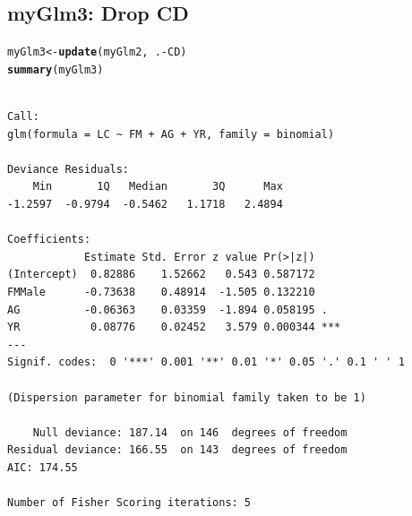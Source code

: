 \documentclass[oneside]{book}\usepackage[]{graphicx}\usepackage[svgnames]{xcolor}
\makeatletter
\newcommand{\hlopt}[1]{\textcolor[rgb]{0,0,0}{#1}}%
\newcommand{\hlstd}[1]{\textcolor[rgb]{0.345,0.345,0.345}{#1}}%
\newcommand{\hlkwb}[1]{\textcolor[rgb]{0.69,0.353,0.396}{#1}}%
\newcommand{\hlkwd}[1]{\textcolor[rgb]{0.737,0.353,0.396}{\textbf{#1}}}%
\newenvironment{kframe}{%
 \def\at@end@of@kframe{}%
 \ifinner\ifhmode%
  \def\at@end@of@kframe{\end{minipage}}%
  \begin{minipage}{\columnwidth}%
 \fi\fi%
 \def\FrameCommand##1{\hskip\@totalleftmargin \hskip-\fboxsep
 \colorbox{shadecolor}{##1}\hskip-\fboxsep
     \hskip-\linewidth \hskip-\@totalleftmargin \hskip\columnwidth}%
 \MakeFramed {\advance\hsize-\width
   \@totalleftmargin\z@ \linewidth\hsize
   \@setminipage}}%
 {\par\unskip\endMakeFramed%
 \at@end@of@kframe}
\newenvironment{knitrout}{}{} %
\makeatother
\begin{document}
\subsection*{myGlm3: Drop CD}
\begin{knitrout}
\color{fgcolor}\begin{kframe}
\begin{alltt}
\hlstd{myGlm3} \hlkwb{<-} \hlkwd{update}\hlstd{(myGlm2,} \hlopt{~}\hlstd{.} \hlopt{-} \hlstd{CD)}
\hlkwd{summary}\hlstd{(myGlm3)}
\end{alltt}
\begin{verbatim}

Call:
glm(formula = LC ~ FM + AG + YR, family = binomial)

Deviance Residuals: 
    Min       1Q   Median       3Q      Max  
-1.2597  -0.9794  -0.5462   1.1718   2.4894  

Coefficients:
            Estimate Std. Error z value Pr(>|z|)    
(Intercept)  0.82886    1.52662   0.543 0.587172    
FMMale      -0.73638    0.48914  -1.505 0.132210    
AG          -0.06363    0.03359  -1.894 0.058195 .  
YR           0.08776    0.02452   3.579 0.000344 ***
---
Signif. codes:  0 '***' 0.001 '**' 0.01 '*' 0.05 '.' 0.1 ' ' 1

(Dispersion parameter for binomial family taken to be 1)

    Null deviance: 187.14  on 146  degrees of freedom
Residual deviance: 166.55  on 143  degrees of freedom
AIC: 174.55

Number of Fisher Scoring iterations: 5
\end{verbatim}
\end{kframe}
\end{knitrout}
\end{document}
